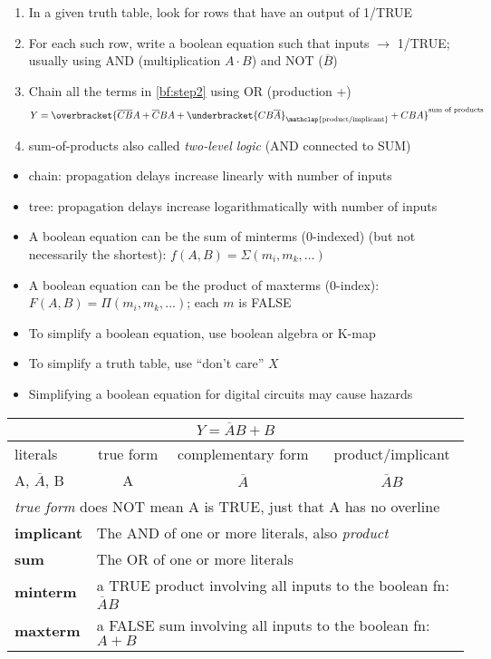 \begin{enumerate}
\item In a given truth table, look for rows that have an output of 1/TRUE
\item\label{bf:step2} For each such row, write a boolean equation such that inputs $\rightarrow$ 1/TRUE; usually using AND (multiplication $A\cdot B$) and NOT ($\overline{B}$)
\item Chain all the terms in \ref{bf:step2} using OR (production +)
  \[
Y = \overbracket{\overline{C}\overline{B}A + \overline{C}BA + \underbracket{CB\overline{A}}_{\mathclap{\text{product/implicant}}} + CBA}^{\text{sum of products}}
  \]
\item sum-of-products also called \emph{two-level logic} (AND connected to SUM)
\end{enumerate}
\begin{itemize}
\item chain: propagation delays increase linearly with number of inputs
\item tree: propagation delays increase logarithmatically with number of inputs
\item A boolean equation can be the sum of minterms (0-indexed) (but not necessarily the shortest): $f(A,B) = \Sigma(m_{i},m_{k},\ldots)$
\item A boolean equation can be the product of maxterms (0-index): $F(A,B) = \Pi(m_{i},m_{k},\ldots)$; each $m$ is FALSE
\item To simplify a boolean equation, use boolean algebra or K-map
\item To simplify a truth table, use ``don't care'' $X$
\item Simplifying a boolean equation for digital circuits may cause hazards
\end{itemize}

\begin{tabular}{l|c|c|c}
  \hline
  \multicolumn{4}{c}{$Y = \overline{A}B + B$} \\
  \hline
  literals & true form & complementary form & product/implicant \\
  \hline
  A, $\overline{A}$, B & A & $\overline{A}$ & $\overline{A}B$\\
  \hline
  \multicolumn{4}{l}{\emph{true form} does NOT mean A is TRUE, just that A has no overline} \\
  \hline
  \textbf{implicant} & \multicolumn{3}{l}{The AND of one or more literals, also \emph{product} } \\
  \textbf{sum} & \multicolumn{3}{l}{The OR of one or more literals} \\
  \textbf{minterm} & \multicolumn{3}{l}{a TRUE product involving all inputs to the boolean fn: $\overline{A}B$}\\
  \textbf{maxterm} & \multicolumn{3}{l}{a FALSE sum involving all inputs to the boolean fn: $A + B$}\\
  \hline
\end{tabular}
\begin{tikzpicture}[framed]

\end{tikzpicture}
